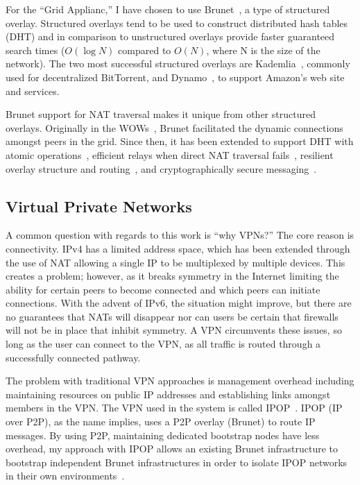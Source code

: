 For the ``Grid Applianc,'' I have chosen to use Brunet~\cite{brunet}, a type of
structured overlay.  Structured overlays tend to be used to construct
distributed hash tables (DHT) and in comparison to unstructured overlays
provide faster guaranteed search times ($O(\log N)$ compared to $O(N)$, where N
is the size of the network).  The two most successful structured overlays are
Kademlia~\cite{kademlia}, commonly used for decentralized BitTorrent, and
Dynamo~\cite{dynamo}, to support Amazon's web site and services.

Brunet support for NAT traversal makes it unique from other structured
overlays.  Originally in the WOWs~\cite{wow}, Brunet facilitated the dynamic
connections amongst peers in the grid.  Since then, it has been extended to
support DHT with atomic operations~\cite{pcgrid07}, efficient relays when
direct NAT traversal fails~\cite{groupvpn}, resilient overlay structure and
routing~\cite{hpdc08_0}, and cryptographically secure
messaging~\cite{groupvpn}.

\subsection{Virtual Private Networks}

A common question with regards to this work is ``why VPNs?''  The core reason
is connectivity.  IPv4 has a limited address space, which has been extended
through the use of NAT allowing a single IP to be multiplexed by multiple
devices.  This creates a problem; however, as it breaks symmetry in the
Internet limiting the ability for certain peers to become connected and which
peers can initiate connections.  With the advent of IPv6, the situation might
improve, but there are no guarantees that NATs will disappear nor can users be
certain that firewalls will not be in place that inhibit symmetry.  A VPN
circumvents these issues, so long as the user can connect to the VPN, as all
traffic is routed through a successfully connected pathway.

The problem with traditional VPN approaches is management overhead including
maintaining resources on public IP addresses and establishing links amongst
members in the VPN.  The VPN used in the system is called IPOP~\cite{groupvpn,
ipop}.  IPOP (IP over P2P), as the name implies, uses a P2P overlay (Brunet) to
route IP messages.  By using P2P, maintaining dedicated bootstrap nodes have
less overhead, my approach with IPOP allows an existing Brunet infrastructure
to bootstrap independent Brunet infrastructures in order to isolate IPOP
networks in their own environments~\cite{bootstrapping}.

